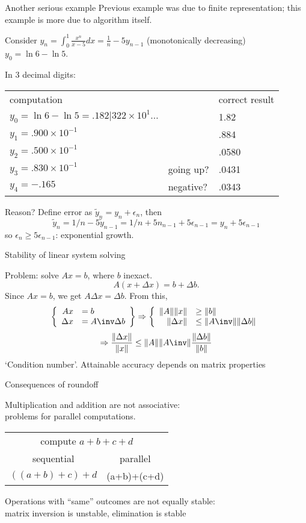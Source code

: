 \begin{numberedframe}{Another serious example}
\small
Previous example was due to finite representation; this example is
more due to algorithm itself.

Consider $y_n=\int_0^1 \frac{x^n}{x-5}dx = \frac1n-5y_{n-1}$
(monotonically decreasing)\\
$y_0=\ln 6 - \ln 5$.

In 3 decimal digits:\\
\begin{tabular}{lll}
  computation&&correct result\\
  $y_0=\ln 6 - \ln 5=.182|322\times 10^{1}\ldots$&&1.82\\
  $y_1=.900\times 10^{-1}$&&.884\\
  $y_2=.500\times 10^{-1}$&&.0580\\
  $y_3=.830\times 10^{-1}$&going up?&.0431\\
  $y_4=-.165$&negative?&.0343
\end{tabular}

Reason? Define error as $\tilde y_n=y_n+\epsilon_n$, then
\[ \tilde y_n=1/n-5\tilde y_{n-1}=1/n+5n_{n-1}+5\epsilon_{n-1}
    = y_n+5\epsilon_{n-1} \]
so $\epsilon_n\geq 5\epsilon_{n-1}$: exponential growth.
\end{numberedframe}

\begin{numberedframe}{Stability of linear system solving}

Problem: solve $Ax=b$, where $b$ inexact.
\[ A(x+\Delta x)=b+\Delta b. \]
Since $Ax=b$, we get $A\Delta x=\Delta b$. From this,
\[
 \left \{
\begin{array}{rl}
  Ax&=b\\ \Delta x&=A\inv \Delta b\\ 
\end{array} \right\} \Rightarrow \left\{
\begin{array}{rl}
  \|A\| \|x\|&\geq\|b\| \\ \|\Delta x\|&\leq \|A\inv\| \|\Delta b\|
\end{array} \right.
\]
\[
\Rightarrow
\frac{\|\Delta x\|}{\|x\|}
\leq 
\|A\| \|A\inv\| \frac{\|\Delta b\|}{\|b\|}
\]
`Condition number'. Attainable accuracy depends on matrix properties
\end{numberedframe}

\begin{numberedframe}{Consequences of roundoff}

Multiplication and addition are not associative:\\
problems for parallel computations.

\begin{tabular}{cc}
  \midrule
  \multicolumn{2}{c}{compute $a+b+c+d$}\\
  sequential&parallel\\
  \midrule
  $((a+b)+c)+d$&(a+b)+(c+d)\\
  \midrule
\end{tabular}

Operations with ``same'' outcomes are not equally stable:\\
matrix inversion is unstable, elimination is stable
\end{numberedframe}

